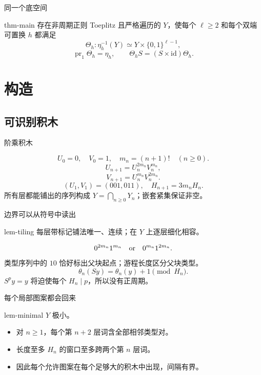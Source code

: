 \documentclass{beamer}
\begin{document}
\begin{frame}{同一个底空间}
\begin{bookresult}{thm-main}
存在非周期正则 Toeplitz 且严格遍历的 $Y$，使每个 $\ell\geq2$ 和每个双端可置换 $h$ 都满足
\[
\Theta_h:\eta_h^{-1}(Y)\simeq Y\times\{0,1\}^{\ell-1},
\]
\[
\operatorname{pr}_1\Theta_h=\eta_h,\qquad
\Theta_h S=(S\times\mathrm{id})\Theta_h.
\]
\end{bookresult}
\end{frame}

\section{构造}
\subsection{可识别积木}

\begin{frame}{阶乘积木}

\[
U_0=0,\quad V_0=1,\quad m_n=(n+1)!\quad(n\geq0).
\]
\[
U_{n+1}=U_n^{2m_n}V_n^{m_n},
\]
\[
V_{n+1}=U_n^{m_n}V_n^{2m_n}.
\]
\[
(U_1,V_1)=(001,011),\quad H_{n+1}=3m_nH_n.
\]
所有层都能铺出的序列构成 $Y=\bigcap_{n\geq0}Y_n$；嵌套紧集保证非空。
\end{frame}

\begin{frame}{边界可以从符号中读出}

\begin{bookresult}{lem-tiling}
每层带标记铺法唯一、连续；在 $Y$ 上逐层细化相容。
\end{bookresult}
\[
0^{2m_n}1^{m_n}\quad\hbox{or}\quad0^{m_n}1^{2m_n}.
\]
类型序列中的 $10$ 恰好标出父块起点；游程长度区分父块类型。
\[
\theta_n(Sy)=\theta_n(y)+1\pmod {H_n}.
\]
$S^py=y$ 将迫使每个 $H_n\mid p$，所以没有正周期。
\end{frame}

\begin{frame}{每个局部图案都会回来}

\begin{bookresult}{lem-minimal}
$Y$ 极小。
\end{bookresult}
\begin{itemize}
\item 对 $n\geq1$，每个第 $n+2$ 层词含全部相邻类型对。
\item 长度至多 $H_n$ 的窗口至多跨两个第 $n$ 层词。
\item 因此每个允许图案在每个足够大的积木中出现，间隔有界。
\end{itemize}
\end{frame}
\end{document}
